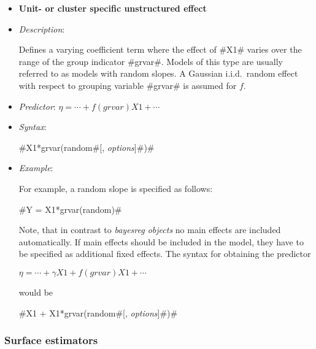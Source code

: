 \begin{itemize}
\item[]{\bf\sffamily Unit- or cluster specific unstructured
effect}

\item[] {\em Description}:

Defines a varying coefficient term where the effect of #X1# varies
over the range of the group indicator #grvar#. Models of this type
are usually referred to as models with random slopes. A Gaussian
i.i.d.~random effect with respect to grouping variable #grvar# is
assumed for $f$.
\item[] {\em Predictor}: $\eta = \cdots + f(grvar)X1 + \cdots$
\item[] {\em Syntax}:

#X1*grvar(random#[, {\em options}]#)#
\item[] {\em Example}:

For example, a random slope is specified as follows:

#Y = X1*grvar(random)#

Note, that in contrast to {\em bayesreg objects} no main effects
are included automatically. If main effects should be included in
the model, they have to be specified as additional fixed effects.
The syntax for obtaining the predictor

$\eta = \cdots + \gamma X1 + f(grvar)X1 + \cdots$

would be

#X1 + X1*grvar(random#[, {\em options}]#)#

\end{itemize}

\subsubsection*{Surface estimators}

